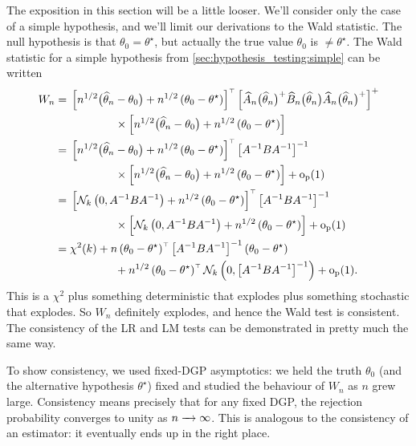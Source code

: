 \documentclass[11pt,letterpaper,reqno,oneside]{article}
\begin{document}
The exposition in this section will be a little looser. We'll consider only the case of a simple hypothesis, and we'll limit our derivations to the Wald statistic. The null hypothesis is that $\theta_0 = \theta^\star$, but actually the true value $\theta_0$ is $\neq \theta^\star$. The Wald statistic for a simple hypothesis from \cref{sec:hypothesis_testing:simple} can be written
%
\begin{align*}
	W_n
	={}& \left[ n^{1/2} \bigl( \widehat{\theta}_n - \theta_0 \bigr) 
	+ n^{1/2} \left( \theta_0 - \theta^\star \right) \right]^{\scriptscriptstyle \top}
	\left[ \widehat{A}_n\bigl( \widehat{\theta}_n \bigr)^+ 
	\widehat{B}_n\bigl( \widehat{\theta}_n \bigr)
	\widehat{A}_n\bigl( \widehat{\theta}_n \bigr)^+ \right]^+
	\\
	&\quad\quad\quad\quad\times
	\left[ n^{1/2} \bigl( \widehat{\theta}_n - \theta_0 \bigr) 
	+ n^{1/2} \left( \theta_0 - \theta^\star \right) \right]
	\\
	={}& \left[ n^{1/2} \bigl( \widehat{\theta}_n - \theta_0 \bigr) 
	+ n^{1/2} \left( \theta_0 - \theta^\star \right) \right]^{\scriptscriptstyle \top}
	\left[ A^{-1} B A^{-1} \right]^{-1}
	\\
	&\quad\quad\quad\quad\times
	\left[ n^{1/2} \bigl( \widehat{\theta}_n - \theta_0 \bigr) 
	+ n^{1/2} \left( \theta_0 - \theta^\star \right) \right]
	+ \mathrm{o}_{\mathrm{p}}(1)
	\\
	={}& \left[ \mathcal{N}_k\left( 0, A^{-1} B A^{-1} \right)
	+ n^{1/2} \left( \theta_0 - \theta^\star \right) \right]^{\scriptscriptstyle \top}
	\left[ A^{-1} B A^{-1} \right]^{-1}
	\\
	&\quad\quad\quad\quad\times
	\left[ \mathcal{N}_k\left( 0, A^{-1} B A^{-1} \right)
	+ n^{1/2} \left( \theta_0 - \theta^\star \right) \right]
	+ \mathrm{o}_{\mathrm{p}}(1)
	\\
	={}& \chi^2(k)
	+ n\left( \theta_0 - \theta^\star \right)^{\scriptscriptstyle \top}
	\left[ A^{-1} B A^{-1} \right]^{-1}
	\left( \theta_0 - \theta^\star \right)
	\\
	&\quad\quad\quad\quad
	+ n^{1/2} \left( \theta_0 - \theta^\star \right)^{\scriptscriptstyle \top} 
	\mathcal{N}_k\left( 0, \left[ A^{-1} B A^{-1} \right]^{-1} \right)
	+ \mathrm{o}_{\mathrm{p}}(1) .
\end{align*}
%
This is a $\chi^2$ plus something deterministic that explodes plus something stochastic that explodes. So $W_n$ definitely explodes, and hence the Wald test is consistent. The consistency of the LR and LM tests can be demonstrated in pretty much the same way.


To show consistency, we used fixed-DGP asymptotics: we held the truth $\theta_0$ (and the alternative hypothesis $\theta^\star$) fixed and studied the behaviour of $W_n$ as $n$ grew large. Consistency means precisely that for any fixed DGP, the rejection probability converges to unity as $n\xrightarrow{\;\;\;}\infty$. This is analogous to the consistency of an estimator: it eventually ends up in the right place.
\end{document}
